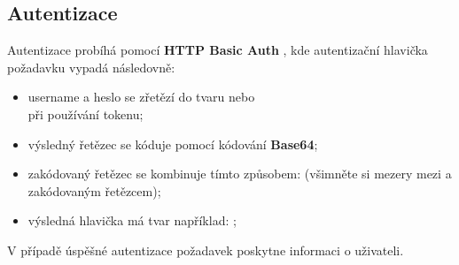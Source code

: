 \documentclass[thesis=B,czech]{FITthesis}[2012/06/26]
\begin{document}
\subsection{Autentizace} \label{auten}
Autentizace probíhá pomocí \textbf{HTTP Basic Auth} \cite{toggl_api_auth}, kde autentizační hlavička požadavku vypadá následovně:
\begin{itemize}
	\item username a heslo se zřetězí do tvaru \textit{} nebo\\ \textit{} při používání tokenu;
	\item výsledný řetězec se kóduje pomocí kódování \textbf{Base64};
	\item zakódovaný řetězec se kombinuje tímto způsobem: \textit{} (všimněte si mezery mezi  a zakódovaným řetězcem);
	\item výsledná hlavička má tvar například: \textit{};
\end{itemize}
V případě úspěšné autentizace požadavek poskytne informaci o uživateli. 
	
\end{document}
